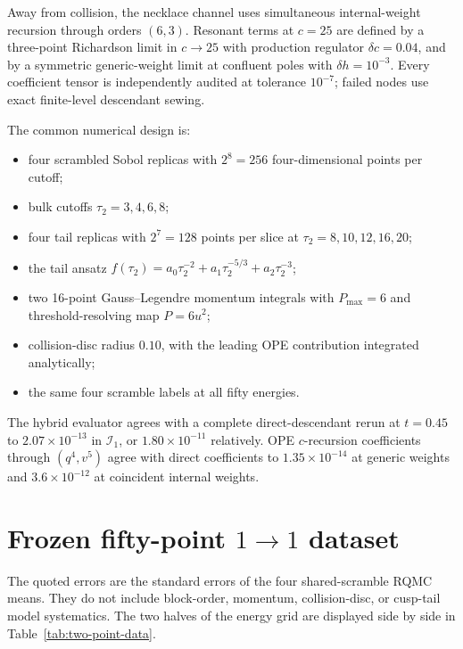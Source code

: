 \documentclass[11pt]{article}
\newcommand{\cI}{\mathcal{I}}
\begin{document}
Away from collision, the necklace channel uses simultaneous internal-weight
recursion through orders $(6,3)$.  Resonant terms at $c=25$ are defined by a
three-point Richardson limit in $c\to25$ with production regulator
$\delta c=0.04$, and by a symmetric generic-weight limit at confluent poles
with $\delta h=10^{-3}$.  Every coefficient tensor is independently audited
at tolerance $10^{-7}$; failed nodes use exact finite-level descendant
sewing.

The common numerical design is:
\begin{itemize}
  \item four scrambled Sobol replicas with $2^8=256$ four-dimensional points
  per cutoff;
  \item bulk cutoffs $\tau_2=3,4,6,8$;
  \item four tail replicas with $2^7=128$ points per slice at
  $\tau_2=8,10,12,16,20$;
  \item the tail ansatz
  $f(\tau_2)=a_0\tau_2^{-2}+a_1\tau_2^{-5/3}+a_2\tau_2^{-3}$;
  \item two 16-point Gauss--Legendre momentum integrals with $P_{\max}=6$
  and threshold-resolving map $P=6u^2$;
  \item collision-disc radius $0.10$, with the leading OPE contribution
  integrated analytically;
  \item the same four scramble labels at all fifty energies.
\end{itemize}

The hybrid evaluator agrees with a complete direct-descendant rerun at
$t=0.45$ to $2.07\times10^{-13}$ in $\cI_1$, or
$1.80\times10^{-11}$ relatively.  OPE $c$-recursion coefficients through
$(q^4,v^5)$ agree with direct coefficients to $1.35\times10^{-14}$ at generic
weights and $3.6\times10^{-12}$ at coincident internal weights.

\clearpage
\section{Frozen fifty-point \texorpdfstring{$1\to1$}{1 to 1} dataset}
\label{sec:two-point-data}

The quoted errors are the standard errors of the four shared-scramble RQMC
means.  They do not include block-order, momentum, collision-disc, or
cusp-tail model systematics.  The two halves of the energy grid are displayed
side by side in Table~\ref{tab:two-point-data}.
\end{document}
